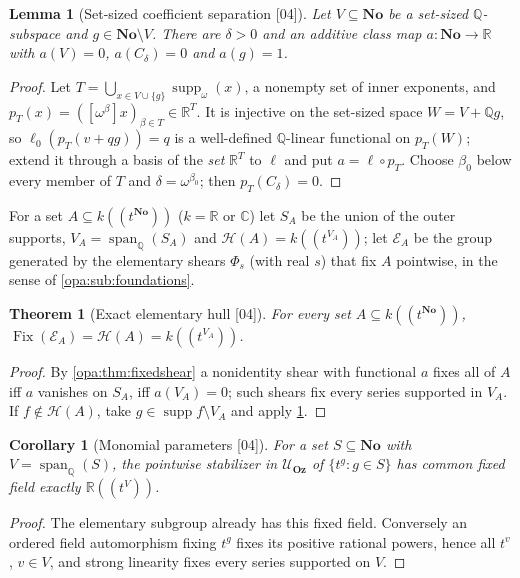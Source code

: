 \documentclass[11pt,oneside]{article}
\numberwithin{equation}{section}
\newtheorem{theorem}{Theorem}[section]
\newtheorem{lemma}[lemma]{Lemma}
\newtheorem{corollary}[corollary]{Corollary}
\theoremstyle{definition}
\theoremstyle{remark}
\newcommand{\No}{\mathbf{No}}
\newcommand{\Oz}{\mathbf{Oz}}
\newcommand{\R}{\mathbb R}
\newcommand{\C}{\mathbb C}
\newcommand{\Q}{\mathbb Q}
\newcommand{\UU}{\mathcal U}
\newcommand{\EE}{\mathcal E}
\newcommand{\HH}{\mathcal H}
\newcommand{\supp}{\operatorname{supp}}
\newcommand{\Fix}{\operatorname{Fix}}
\newcommand{\Span}{\operatorname{span}_{\Q}}
\newcommand{\Hahn}[2]{#1((t^{#2}))}
\newcommand{\src}[1]{\textup{\textsf{\small[#1]}}}
\begin{document}
\begin{lemma}[Set-sized coefficient separation \src{04}]\label{opa:lem:separation}
Let $V\subseteq\No$ be a set-sized $\Q$-subspace and $g\in\No\setminus V$. There are
$\delta>0$ and an additive class map $a:\No\to\R$ with $a(V)=0$,
$a(C_\delta)=0$ and $a(g)=1$.
\end{lemma}
\begin{proof}
Let $T=\bigcup_{x\in V\cup\{g\}}\supp_\omega(x)$, a nonempty set of inner exponents,
and $p_T(x)=([\omega^\beta]x)_{\beta\in T}\in\R^T$. It is injective on the set-sized
space $W=V+\Q g$, so $\ell_0(p_T(v+qg))=q$ is a well-defined $\Q$-linear functional
on $p_T(W)$; extend it through a basis of the \emph{set} $\R^T$ to $\ell$ and put
$a=\ell\circ p_T$. Choose $\beta_0$ below every member of $T$ and
$\delta=\omega^{\beta_0}$; then $p_T(C_\delta)=0$.
\end{proof}

For a set $A\subseteq\Hahn k\No$ ($k=\R$ or $\C$) let $S_A$ be the union of the outer
supports, $V_A=\Span(S_A)$ and $\HH(A)=\Hahn k{V_A}$; let $\EE_A$ be the group
generated by the elementary shears $\Phi_s$ (with real $s$) that fix $A$
pointwise, in the sense of \cref{opa:sub:foundations}.

\begin{theorem}[Exact elementary hull \src{04}]\label{opa:thm:hull}
For every set $A\subseteq\Hahn k\No$, $\Fix(\EE_A)=\HH(A)=\Hahn k{V_A}$.
\end{theorem}
\begin{proof}
By \cref{opa:thm:fixedshear} a nonidentity shear with functional $a$ fixes all of
$A$ iff $a$ vanishes on $S_A$, iff $a(V_A)=0$; such shears fix every series
supported in $V_A$. If $f\notin\HH(A)$, take $g\in\supp f\setminus V_A$ and apply
\cref{opa:lem:separation}.
\end{proof}

\begin{corollary}[Monomial parameters \src{04}]\label{opa:cor:monoparams}
For a set $S\subseteq\No$ with $V=\Span(S)$, the pointwise stabilizer in $\UU_\Oz$
of $\{t^g:g\in S\}$ has common fixed field exactly $\Hahn\R V$.
\end{corollary}
\begin{proof}
The elementary subgroup already has this fixed field. Conversely an ordered
field automorphism fixing $t^g$ fixes its positive rational powers, hence all
$t^v$, $v\in V$, and strong linearity fixes every series supported on $V$.
\end{proof}
\end{document}
